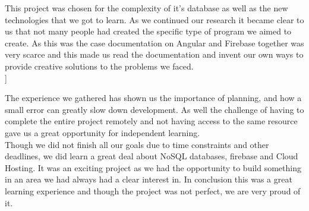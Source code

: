 This project was chosen for the complexity of it's database as well as the new technologies that we got to learn. As we continued our research it became clear to us that not many people had created  the specific type of program we aimed to create. As this was the case documentation on Angular and Firebase together was very scarce and this made us read the documentation and invent our own ways to provide creative solutions to the problems we faced.\\]

The experience we gathered has shown us the importance of planning, and how a small error can greatly slow down development. As well the challenge of having to complete the entire project remotely and not having access to the same resource gave us a great opportunity for independent learning.\\

Though we did not finish all our goals due to time constraints and other deadlines, we did learn a great deal about NoSQL databases, firebase and Cloud Hosting. It was an exciting project as we had the opportunity to build something in an area we had always had a clear interest in. In conclusion this was a great learning experience and though the project was not perfect, we are very proud of it.